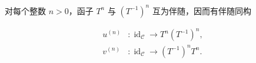 对每个整数 $n>0$，函子 $T^n$ 与 $(T^{-1})^n$ 互为伴随，因而有伴随同构

\begin{equation}
  \begin{aligned}
    u^{(n)}&\colon\operatorname{id}_{\mathcal C}
      \longrightarrow T^n(T^{-1})^n,\\
    v^{(n)}&\colon\operatorname{id}_{\mathcal C}
      \longrightarrow (T^{-1})^nT^n.
  \end{aligned}
  \tag{1.5.14.2}
\end{equation}
